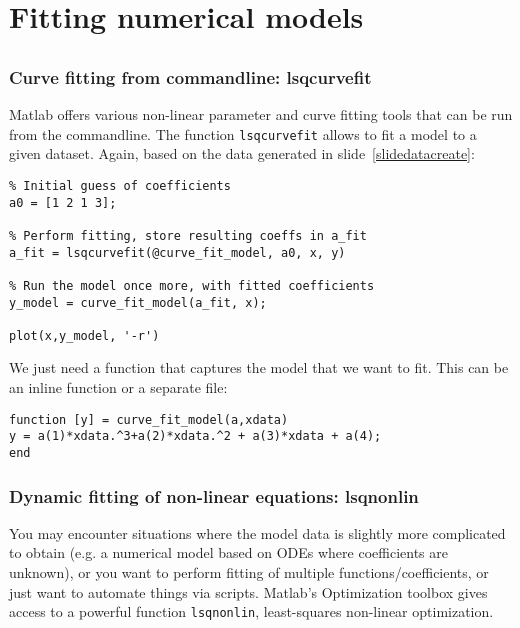\section{Fitting numerical models}
\subsection*{}
\begin{frame}[fragile] 
\frametitle{Curve fitting from commandline: lsqcurvefit}
Matlab offers various non-linear parameter and curve fitting tools that can be run from the commandline. The function \lstinline$lsqcurvefit$ allows to fit a model to a given dataset. Again, based on the data generated in slide~\ref{slidedatacreate}:
  \begin{lstlisting}
% Initial guess of coefficients
a0 = [1 2 1 3];

% Perform fitting, store resulting coeffs in a_fit
a_fit = lsqcurvefit(@curve_fit_model, a0, x, y)

% Run the model once more, with fitted coefficients
y_model = curve_fit_model(a_fit, x);

plot(x,y_model, '-r')
  \end{lstlisting}
  We just need a function that captures the model that we want to fit. This can be an inline function or a separate file:
  \begin{lstlisting}
function [y] = curve_fit_model(a,xdata)
y = a(1)*xdata.^3+a(2)*xdata.^2 + a(3)*xdata + a(4);
end
  \end{lstlisting}
\end{frame}

\begin{frame}[fragile] 
  \frametitle{Dynamic fitting of non-linear equations: lsqnonlin}
  You may encounter situations where the model data is slightly more complicated to obtain (e.g. a numerical model based on ODEs where coefficients are unknown), or you want to perform fitting of multiple functions/coefficients, or just want to automate things via scripts. Matlab's Optimization toolbox gives access to a powerful function \lstinline$lsqnonlin$, least-squares non-linear optimization.
\end{frame}
  
